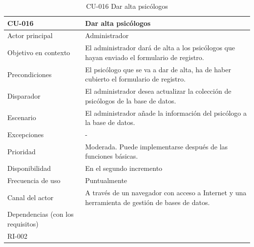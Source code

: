 \clearpage


\begin{table}[htpb]
\centering
\begin{tabularx}{\textwidth}{|X|X|}
\hline
\textbf{CU-016}                            & \textbf{Dar alta psicólogos                                                                           } \\ \hline
Actor principal                   & Administrador                                                                                  \\ \hline
Objetivo en contexto              & El administrador dará de alta a los psicólogos que hayan enviado el formulario de registro.    \\ \hline
Precondiciones                    & El psicólogo que se va a dar de alta, ha de haber cubierto el formulario de registro.          \\ \hline
Disparador                        & El administrador desea actualizar la colección de psicólogos de la base de datos.              \\ \hline
Escenario                         & El administrador añade la información del psicólogo a la base de datos.                        \\ \hline
Excepciones                       & -                                                                                              \\ \hline
Prioridad                         & Moderada. Puede implementarse después de las funciones básicas.                                \\ \hline
Disponibilidad                    & En el segundo incremento                                                                       \\ \hline
Frecuencia de uso                 & Puntualmente                                                                                   \\ \hline
Canal del actor                   & A través de un navegador con acceso a Internet y una herramienta de gestión de bases de datos. \\ \hline
Dependencias (con los requisitos) & \begin{tabular}[c]{@{}l@{}}RI-003\\ RI-002\end{tabular}                                        \\ \hline
\end{tabularx}
\caption{CU-016 Dar alta psicólogos}                          
\end{table}


